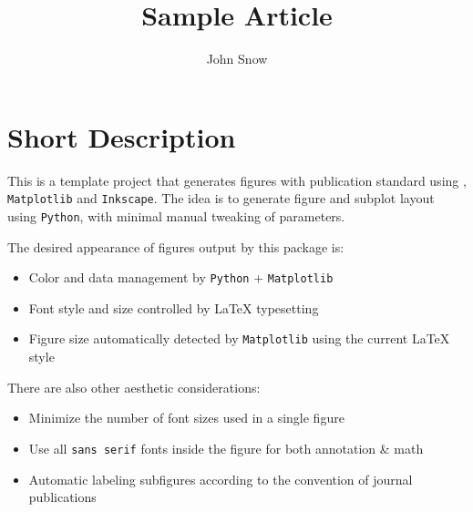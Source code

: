 


\usepackage{etoolbox}



\title{Sample Article}
\author{John Snow}
\newcommand*{\mpl}{\texttt{Matplotlib}\xspace}
\newcommand*{\ink}{\texttt{Inkscape}\xspace}
\newcommand*{\py}{\texttt{Python}\xspace}


\maketitle

\doublespacing


\section{Short Description}
\label{sec:usage}

This is a template project that generates figures with publication
standard using \LaTeXe{}, \mpl and \ink. The idea is to generate
figure and subplot layout using \py, with minimal manual tweaking of
parameters.

The desired appearance of figures output by this package is:
\begin{itemize}
\item Color and data management by \py{} + \mpl{}
\item Font style and size controlled by \LaTeX{} typesetting
\item Figure size automatically detected by \mpl{} using the current \LaTeX{} style
\end{itemize}

There are also other aesthetic considerations:
\begin{itemize}
\item Minimize the number of font sizes used in a single figure
\item Use all \texttt{sans serif} fonts inside the figure for both annotation \& math
\item Automatic labeling subfigures according to the convention of journal publications
\end{itemize}

